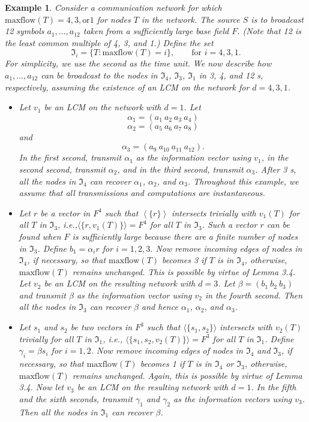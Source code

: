 \documentclass[journal]{IEEEtran}
\newtheorem{exam}[prop]{Example}
\begin{document}
\begin{exam}
	Consider a communication network for which $\text{maxflow}(T)=4,3,\text{or}1$ for nodes $T$ in the network. The source $S$ is to broadcast 12 symbols $a_1, \dots, a_{12}$ taken from a sufficiently large base field $F$. (Note that 12 is the least common multiple of 4, 3, and 1.) Define the set
	$$\Im_i=\{T:\text{maxflow}(T)=i\},\qquad \text{for }i=4,3,1.$$
	For simplicity, we use the second as the time unit. We now describe how $a_1, \dots, a_{12}$ can be broadcast to the nodes in $\Im_4$, $\Im_3$, $\Im_1$	in 3, 4, and 12 s, respectively, assuming the existence of an LCM on the network for $d=4,3,1$.
	\begin{itemize}
		\item[a)] Let $v_1$ be an LCM on the network with $d=1$. Let 
		$$\alpha_1=(a_1\ a_2\ a_3\ a_4)$$
		$$\alpha_2=(a_5\ a_6\ a_7\ a_8)$$
		and
		$$\alpha_3=(a_9\ a_{10}\ a_{11}\ a_{12}).$$
		In the first second, transmit $\alpha_1$ as the information vector using $v_1$, in the second second, transmit $\alpha_2$, and in the 	third second, transmit $\alpha_3$. After 3 s, all the nodes in $\Im_4$ can recover $\alpha_1$, $\alpha_2$, and $\alpha_3$. Throughout this example, we assume that all transmissions and computations are instantaneous.
		\item[b)] Let $r$ be a vector in $F^4$ such that $\left \langle \{r\}\right \rangle$ intersects trivially with $v_1(T)$ for all $T$ in $\Im_3$, i.e.,$\langle \{r,v_1(T)\} \rangle=F^4$ for all $T$ in $\Im_3$. Such a vector $r$ can be found when $F$ is sufficiently large because there are a finite number of nodes in $\Im_3$. Define $b_1=\alpha_i r$ for $i=1,2,3$. Now remove incoming edges of nodes in $\Im_4$, if necessary, so that $\text{maxflow}(T)$ becomes 3 if $T$ is in $\Im_4$, otherwise, $\text{maxflow}(T)$ remains unchanged. This is possible by virtue of Lemma 3.4. Let $v_2$ be an LCM on the resulting network with $d=3$. Let $\beta=(b_1\ b_2\ b_3)$ and transmit $\beta$ as the information vector using $v_2$ in the fourth second. Then all the nodes in $\Im_3$ can recover $\beta$ and hence $\alpha_1$, $\alpha_2$, and $\alpha_3$.
		\item[c)] Let $s_1$ and $s_2$ be two vectors in $F^3$ such that $\langle \{s_1,s_2\}\rangle$ intersects with $v_2(T)$ trivially for all $T$ in $\Im_1$, i.e., $\langle \{s_1,s_2,v_2(T)\}\rangle = F^3$ for all $T$ in $\Im_1$. Define $\gamma_i=\beta s_i$ for $i=1,2$. Now remove incoming edges of nodes in $\Im_4$ and $\Im_3$, if necessary, so that $\text{maxflow}(T)$ becomes 1 if $T$ is in $\Im_4$ or $\Im_3$, otherwise, $\text{maxflow}(T)$ remains unchanged. Again, this is possible by virtue of Lemma	3.4. Now let $v_3$ be an LCM on the resulting network with $d=1$. In the fifth and the sixth seconds, transmit $\gamma_1$ and $\gamma_2$ as the information vectors using $v_3$. Then all the	nodes in $\Im_1$ can recover $\beta$.

\end{itemize}
\end{exam}
\end{document}
